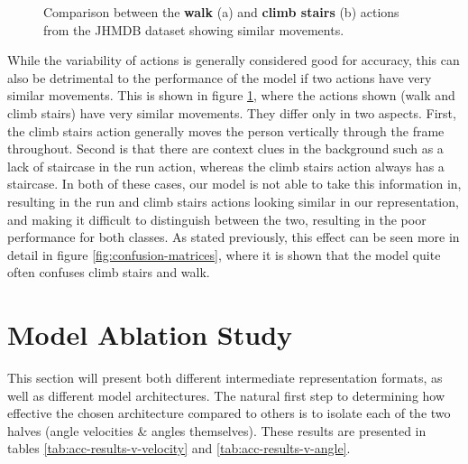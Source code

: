 \begin{figure}[ht]
	\centering
	\caption{Comparison between the \textbf{walk} (a) and \textbf{climb stairs} (b) actions from the JHMDB dataset \cite{JHMDB} showing similar movements.}
	\label{fig:walk-climb-actions}
\end{figure}

While the variability of actions is generally considered good for accuracy, this can also be detrimental to the performance of the model if two actions have very similar movements. This is shown in figure \ref{fig:walk-climb-actions}, where the actions shown (walk and climb stairs) have very similar movements. They differ only in two aspects. First, the climb stairs action generally moves the person vertically through the frame throughout. Second is that there are context clues in the background such as a lack of staircase in the run action, whereas the climb stairs action always has a staircase. In both of these cases, our model is not able to take this information in, resulting in the run and climb stairs actions looking similar in our representation, and making it difficult to distinguish between the two, resulting in the poor performance for both classes. As stated previously, this effect can be seen more in detail in figure \ref{fig:confusion-matrices}, where it is shown that the model quite often confuses climb stairs and walk.

\section{Model Ablation Study}

This section will present both different intermediate representation formats, as well as different model architectures. The natural first step to determining how effective the chosen architecture compared to others is to isolate each of the two halves (angle velocities \& angles themselves). These results are presented in tables \ref{tab:acc-results-v-velocity} and \ref{tab:acc-results-v-angle}.

